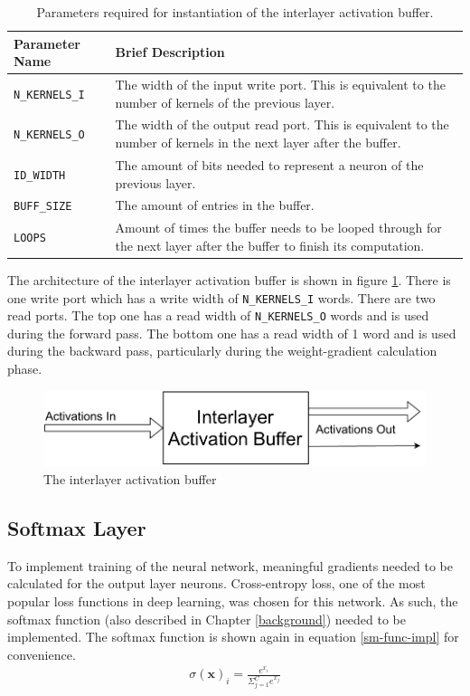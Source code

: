 \begin{table}
	\centering
	\begin{tabularx}{\textwidth}{|l| X|}
		\hline
		\textbf{Parameter Name}	& \textbf{Brief Description}\\\hline
		\texttt{N\_KERNELS\_I} & 
		The width of the input write port. This is equivalent to the number of kernels of the previous layer. \\\hline
		
		\texttt{N\_KERNELS\_O} & 
		The width of the output read port. This is equivalent to the number of kernels in the next layer after the buffer.\\\hline
		
		\texttt{ID\_WIDTH} &
		The amount of bits needed to represent a neuron of the previous layer.\\\hline 
		
		\texttt{BUFF\_SIZE} &
		The amount of entries in the buffer. \\\hline 
		
		\texttt{LOOPS} &
		Amount of times the buffer needs to be looped through for the next layer after the buffer to finish its computation.
		\\\hline
	\end{tabularx}	
	\caption{Parameters required for instantiation of the interlayer activation buffer.}
	\label{interlayer-arch-params}
\end{table}

The architecture of the interlayer activation buffer is shown in figure \ref{interlayer-arch}. There is one write port which has a write width of \texttt{N\_KERNELS\_I} words. There are two read ports. The top one has a read width of \texttt{N\_KERNELS\_O} words and is used during the forward pass. The bottom one has a read width of 1 word and is used during the backward pass, particularly during the weight-gradient calculation phase.
\begin{figure}
	\centering 
	\includegraphics[width=\textwidth]{figures/interlayer_buffer}
	\caption{The interlayer activation buffer}\label{interlayer-arch}
\end{figure}

\subsection{Softmax Layer}
To implement training of the neural network, meaningful gradients needed to be calculated for the output layer neurons. Cross-entropy loss, one of the most popular loss functions in deep learning, was chosen for this network. As such, the softmax function (also described in Chapter \ref{background}) needed to be implemented. The softmax function is shown again in equation \ref{sm-func-impl} for convenience.
\begin{align}
\sigma(\mathbf{x})_i = \frac{e^{x_i}}{\Sigma_{j=1}^C e^{x_j}} \label{sm-func-impl}
\end{align}

